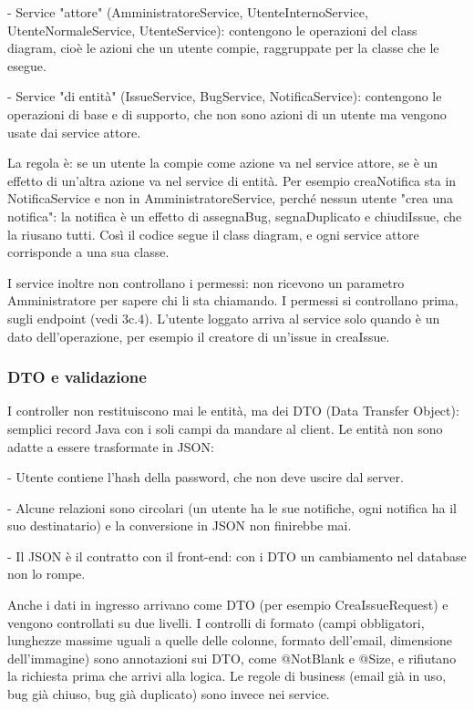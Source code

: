 - Service "attore" (AmministratoreService, UtenteInternoService, UtenteNormaleService, UtenteService): contengono le operazioni del class diagram, 
cioè le azioni che un utente compie, raggruppate per la classe che le esegue. 

- Service "di entità" (IssueService, BugService, NotificaService): contengono le operazioni 
di base e di supporto, che non sono azioni di un utente ma vengono usate dai service attore. 

La regola è: se un utente la compie come azione va nel service attore, se è un effetto 
di un'altra azione va nel service di entità. Per esempio creaNotifica sta in NotificaService 
e non in AmministratoreService, perché nessun utente "crea una notifica": la notifica è un 
effetto di assegnaBug, segnaDuplicato e chiudiIssue, che la riusano tutti. Così il codice 
segue il class diagram, e ogni service attore corrisponde a una sua classe. 

I service inoltre non controllano i permessi: non ricevono un parametro Amministratore 
per sapere chi li sta chiamando. I permessi si controllano prima, sugli endpoint (vedi 3c.4).
 L'utente loggato arriva al service solo quando è un dato dell'operazione, per esempio il 
 creatore di un'issue in creaIssue.

\subsubsection{DTO e validazione}
I controller non restituiscono mai le entità, ma dei DTO (Data Transfer Object): semplici 
record Java con i soli campi da mandare al client. Le entità non sono adatte a essere 
trasformate in JSON: 

- Utente contiene l'hash della password, che non deve uscire dal server. 

- Alcune relazioni sono circolari (un utente ha le sue notifiche, ogni notifica 
ha il suo destinatario) e la conversione in JSON non finirebbe mai. 

- Il JSON è il contratto con il front-end: con i DTO un cambiamento nel 
database non lo rompe. 

Anche i dati in ingresso arrivano come DTO (per esempio CreaIssueRequest) e 
vengono controllati su due livelli. I controlli di formato (campi obbligatori, 
lunghezze massime uguali a quelle delle colonne, formato dell'email, dimensione 
dell'immagine) sono annotazioni sui DTO, come @NotBlank e @Size, e rifiutano la 
richiesta prima che arrivi alla logica. Le regole di business (email già in uso, 
bug già chiuso, bug già duplicato) sono invece nei service.

